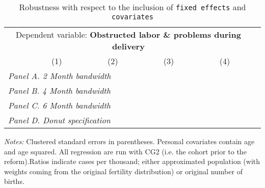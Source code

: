  \begin{table}[H] \begin{threeparttable} \centering \caption{Robustness with respect to the inclusion of \texttt{fixed effects} and \texttt{covariates}} {\def\sym#1{\ifmmode^{#1}\else\(^{#1}\)\fi} \begin{tabular}{l*{5}{c}} \toprule \multicolumn{5}{c}{Dependent variable: \textbf{Obstructed labor \& problems during delivery}} \\ \cmidrule(lr){2-5}
            &\multicolumn{1}{c}{(1)}&\multicolumn{1}{c}{(2)}&\multicolumn{1}{c}{(3)}&\multicolumn{1}{c}{(4)}\\
\midrule
 \multicolumn{5}{l}{\emph{Panel A. 2 Month bandwidth}} \\    \midrule\multicolumn{5}{l}{\emph{Panel B. 4 Month bandwidth}} \\    \midrule\multicolumn{5}{l}{\emph{Panel C. 6 Month bandwidth}} \\    \midrule\multicolumn{5}{l}{\emph{Panel D. Donut specification}} \\    \midrule  
\bottomrule \end{tabular} } \begin{tablenotes} \item \scriptsize \emph{Notes:} Clustered standard errors in parentheses. Personal covariates contain age and age squared. All regression are run with CG2 (i.e. the cohort prior to the reform).Ratios indicate cases per thousand; either approximated population (with weights coming from the original fertility distribution) or original number of births. \end{tablenotes} \end{threeparttable} \end{table} 
